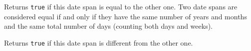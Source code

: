 



Returns {\tt true} if this date span is equal to the other one. Two date spans
are considered equal if and only if they have the same number of years and
months and the same total number of days (counting both days and weeks).



Returns {\tt true} if this date span is different from the other one.


